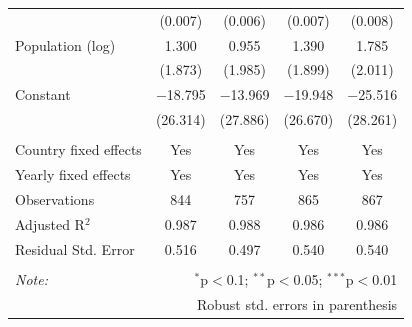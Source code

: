 \documentclass[10pt,letterpaper]{article}
\begin{document}
\begin{table}[!htbp]
\begin{tabular}{@{\extracolsep{1pt}}lcccc}
  & (0.007) & (0.006) & (0.007) & (0.008) \\ 
  Population (log) & 1.300 & 0.955 & 1.390 & 1.785 \\ 
  & (1.873) & (1.985) & (1.899) & (2.011) \\ 
  Constant & $-$18.795 & $-$13.969 & $-$19.948 & $-$25.516 \\ 
  & (26.314) & (27.886) & (26.670) & (28.261) \\ 
 \hline \\[-1.8ex] 
Country fixed effects & Yes & Yes & Yes & Yes \\ 
Yearly fixed effects & Yes & Yes & Yes & Yes \\ 
Observations & 844 & 757 & 865 & 867 \\ 
Adjusted R$^{2}$ & 0.987 & 0.988 & 0.986 & 0.986 \\ 
Residual Std. Error & 0.516 & 0.497 & 0.540 & 0.540 \\ 
\hline 
\hline \\[-1.8ex] 
\textit{Note:}  & \multicolumn{4}{r}{$^{*}$p$<$0.1; $^{**}$p$<$0.05; $^{***}$p$<$0.01} \\ 
 & \multicolumn{4}{r}{Robust std. errors in parenthesis} \\ 
\end{tabular} 
\end{table}
\end{document}
